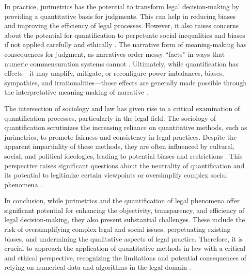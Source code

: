 In practice, jurimetrics has the potential to transform legal decision-making by providing a quantitative basis for judgments. This can help in reducing biases and improving the efficiency of legal processes. However, it also raises concerns about the potential for quantification to perpetuate social inequalities and biases if not applied carefully and ethically \cite{101111lsi12334}. The narrative form of meaning-making has consequences for judgment, as narratives order messy “facts” in ways that numeric commensuration systems cannot \cite{101111lsi12334}. Ultimately, while quantification has effects—it may amplify, mitigate, or reconfigure power imbalances, biases, sympathies, and irrationalities—those effects are generally made possible through the interpretative meaning-making of narrative \cite{101111lsi12334}.

The intersection of sociology and law has given rise to a critical examination of quantification processes, particularly in the legal field. The sociology of quantification scrutinizes the increasing reliance on quantitative methods, such as jurimetrics, to promote fairness and consistency in legal practices. Despite the apparent impartiality of these methods, they are often influenced by cultural, social, and political ideologies, leading to potential biases and restrictions \cite{10.1057/s41599-020-00557-0, de2010jurimetrics, 10.1177/09596801221075807}. This perspective raises significant questions about the neutrality of quantification and its potential to legitimize certain viewpoints or oversimplify complex social phenomena \cite{10.1111/ilr.12067, 10.20396/rdbci.v18i0.8658889}.

In conclusion, while jurimetrics and the quantification of legal phenomena offer significant potential for enhancing the objectivity, transparency, and efficiency of legal decision-making, they also present substantial challenges. These include the risk of oversimplifying complex legal and social issues, perpetuating existing biases, and undermining the qualitative aspects of legal practice. Therefore, it is crucial to approach the application of quantitative methods in law with a critical and ethical perspective, recognizing the limitations and potential consequences of relying on numerical data and algorithms in the legal domain \cite{101111lsi12334}.


